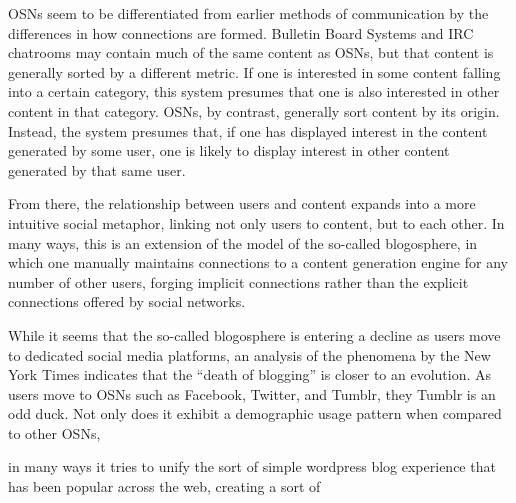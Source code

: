 OSNs seem to be differentiated from earlier methods of communication by 
the differences in how connections are formed.  Bulletin Board Systems and
IRC chatrooms may contain much of the same content as OSNs, but that 
content is generally sorted by a different metric.  If one is interested in 
some content falling into a certain category, this system presumes that one is 
also interested in other content in that category.  OSNs, by contrast, 
generally sort content by its origin.  Instead, the system presumes that, 
if one has displayed interest in the content generated by some user, one is 
likely to display interest in other content generated by that same user.

From there, the relationship between users and content expands into a 
more intuitive social metaphor, linking not only users to content, but 
to each other.  In many ways, this is an extension of the model of the 
so-called blogosphere, in which one manually maintains connections to 
a content generation engine for any number of other users, forging 
implicit connections rather than the explicit connections offered by 
social networks. 



While it seems that the so-called blogosphere is entering a decline 
as users move to dedicated social media platforms, an analysis of the 
phenomena by the New York Times\cite{kopytoff2011blogs} indicates that 
the ``death of blogging'' is closer to an evolution.  As users move to 
OSNs such as Facebook, Twitter, and Tumblr, they
Tumblr is an odd duck.  Not only does it exhibit a demographic usage 
pattern when compared to other OSNs,

 in many ways it tries to unify 
the sort of simple wordpress blog experience that has been popular 
across the web, creating a sort of 







